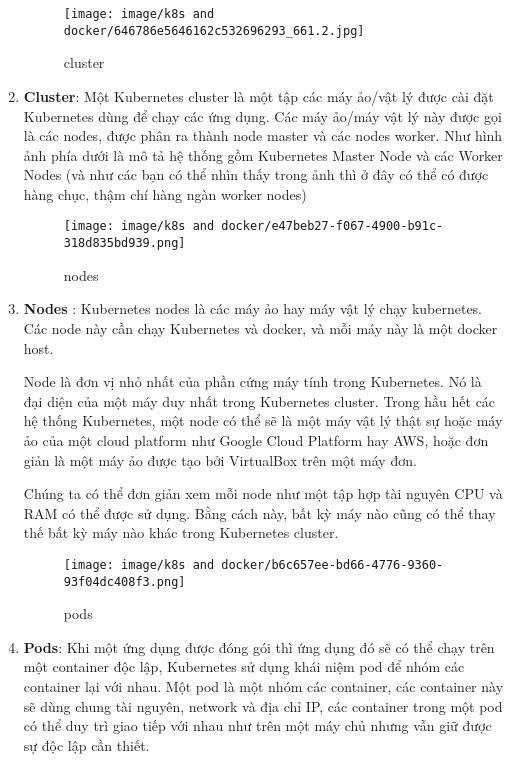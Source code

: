 \documentclass[a4paper,12pt]{article}
\begin{document}
\begin{enumerate}

\begin{figure}[htbp]
    \centering
    \texttt{[image: image/k8s and docker/646786e5646162c532696293\_661.2.jpg]}
    \caption{cluster}
    \label{}
\end{figure}


    \item \textbf{Cluster}: Một Kubernetes cluster là một tập các máy ảo/vật lý được cài đặt Kubernetes dùng để chạy các ứng dụng. Các máy ảo/máy vật lý này được gọi là các nodes, được phân ra thành node master và các nodes worker. Như hình ảnh phía dưới là mô tả hệ thống gồm Kubernetes Master Node và các Worker Nodes (và như các bạn có thể nhìn thấy trong ảnh thì ở đây có thể có được hàng chục, thậm chí hàng ngàn worker nodes)


\begin{figure}[h]
    \centering
    \texttt{[image: image/k8s and docker/e47beb27-f067-4900-b91c-318d835bd939.png]}
    \caption{nodes}
    \label{fig:ten_hinh}
\end{figure}

    
    \item \textbf{Nodes} : Kubernetes nodes là các máy ảo hay máy vật lý chạy kubernetes. Các node này cần chạy Kubernetes và docker, và mỗi máy này là một docker host. 

Node là đơn vị nhỏ nhất của phần cứng máy tính trong Kubernetes. Nó là đại diện của một máy duy nhất trong Kubernetes cluster. Trong hầu hết các hệ thống Kubernetes, một node có thể sẽ là một máy vật lý thật sự hoặc máy ảo của một cloud platform như Google Cloud Platform hay AWS, hoặc đơn giản là một máy ảo được tạo bởi VirtualBox trên một máy đơn.

Chúng ta có thể đơn giản xem mỗi node như một tập hợp tài nguyên CPU và RAM có thể được sử dụng. Bằng cách này, bất kỳ máy nào cũng có thể thay thế bất kỳ máy nào khác trong Kubernetes cluster.
    
\begin{figure}[h]
    \centering
    \texttt{[image: image/k8s and docker/b6c657ee-bd66-4776-9360-93f04dc408f3.png]}
    \caption{pods}
    \label{fig:ten_hinh}
\end{figure}



    \item \textbf{Pods}: Khi một ứng dụng được đóng gói thì ứng dụng đó sẽ có thể chạy trên một container độc lập, Kubernetes sử dụng khái niệm pod để nhóm các container lại với nhau. Một pod là một nhóm các container, các container này sẽ dùng chung tài nguyên, network và địa chỉ IP, các container trong một pod có thể duy trì giao tiếp với nhau như trên một máy chủ nhưng vẫn giữ được sự độc lập cần thiết.


\end{enumerate}
\end{document}
